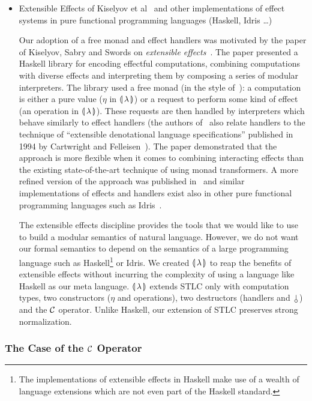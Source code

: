\begin{itemize}
\item Extensible Effects of Kiselyov et al~\cite{kiselyov2013extensible}
  and other implementations of effect systems in pure functional
  programming languages (Haskell, Idris \ldots)

  Our adoption of a free monad and effect handlers was motivated by the
  paper of Kiselyov, Sabry and Swords on \emph{extensible
    effects}~\cite{kiselyov2013extensible}. The paper presented a Haskell
  library for encoding effectful computations, combining computations with
  diverse effects and interpreting them by composing a series of modular
  interpreters. The library used a free monad (in the style
  of~\cite{swierstra2008data}): a computation is either a pure value
  ($\eta$ in ${\llparenthesis \, \lambda \, \rrparenthesis}$) or a request to perform some kind of effect (an
  operation in ${\llparenthesis \, \lambda \, \rrparenthesis}$). These requests are then handled by interpreters
  which behave similarly to effect handlers (the authors
  of~\cite{kiselyov2013extensible} also relate handlers to the technique of
  ``extensible denotational language specifications'' published in 1994 by
  Cartwright and Felleisen~\cite{cartwright1994extensible}). The paper
  demonstrated that the approach is more flexible when it comes to
  combining interacting effects than the existing state-of-the-art
  technique of using monad transformers. A more refined version of the
  approach was published in~\cite{kiselyov2015freer} and similar
  implementations of effects and handlers exist also in other pure
  functional programming languages such as
  Idris~\cite{brady2013programming}.

  The extensible effects discipline provides the tools that we would like
  to use to build a modular semantics of natural language. However, we do
  not want our formal semantics to depend on the semantics of a large
  programming language such as Haskell\footnote{The implementations of
    extensible effects in Haskell make use of a wealth of language
    extensions which are not even part of the Haskell standard.} or
  Idris. We created ${\llparenthesis \, \lambda \, \rrparenthesis}$ to reap the benefits of extensible effects
  without incurring the complexity of using a language like Haskell as our
  meta language. ${\llparenthesis \, \lambda \, \rrparenthesis}$ extends STLC only with computation types, two
  constructors ($\eta$ and operations), two destructors (handlers and
  $\cherry$) and the $\mathcal{C}$ operator. Unlike Haskell, our extension of STLC
  preserves strong normalization.
\end{itemize}


\subsubsection{The Case of the $\mathcal{C}$ Operator}

